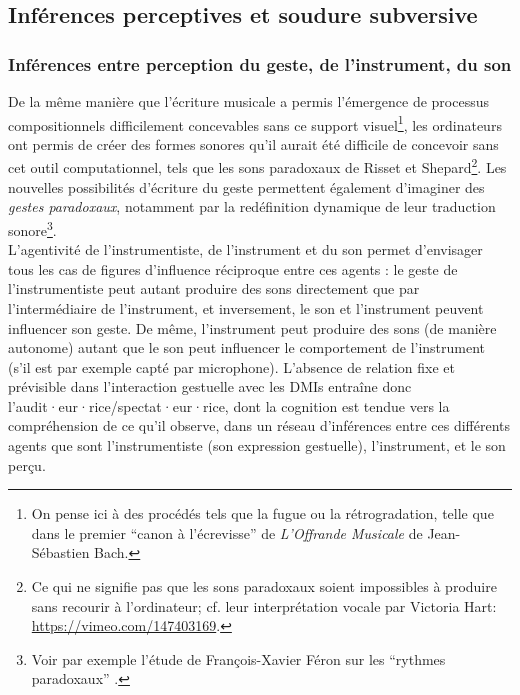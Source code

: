 \subsection{Inférences perceptives et soudure subversive}
\label{sec:gesture:inferences-soudure}

\subsubsection{Inférences entre perception du geste, de l'instrument, du son}
\label{sec:gesture:inferences-soudure:inferences}

\noindent De la même manière que l'écriture musicale a permis l'émergence de processus compositionnels difficilement concevables sans ce support visuel\footnote{On pense ici à des procédés tels que la fugue ou la rétrogradation, telle que dans le premier ``canon à l'écrevisse'' de \textit{L'Offrande Musicale} de Jean-Sébastien Bach.}, les ordinateurs ont permis de créer des formes sonores qu'il aurait été difficile de concevoir sans cet outil computationnel, tels que les sons paradoxaux de Risset et Shepard\footnote{Ce qui ne signifie pas que les sons paradoxaux soient impossibles à produire sans recourir à l'ordinateur; cf. leur interprétation vocale par Victoria Hart: \url{https://vimeo.com/147403169}.}. Les nouvelles possibilités d'écriture du geste permettent également d'imaginer des \textit{gestes paradoxaux}, notamment par la redéfinition dynamique de leur traduction sonore\footnote{Voir par exemple l'étude de François-Xavier Féron sur les ``rythmes paradoxaux'' \cite{feron_lart_2010}.}.\\
\indent L'agentivité de l'instrumentiste, de l'instrument et du son permet d'envisager tous les cas de figures d'influence réciproque entre ces agents : le geste de l'instrumentiste peut autant produire des sons directement que par l'intermédiaire de l'instrument, et inversement, le son et l'instrument peuvent influencer son geste. De même, l'instrument peut produire des sons (de manière autonome) autant que le son peut influencer le comportement de l'instrument (s'il est par exemple capté par microphone). L'absence de relation fixe et prévisible dans l'interaction gestuelle avec les \glspl{DMI} entraîne donc l'audit·eur·rice/spectat·eur·rice, dont la cognition est tendue vers la compréhension de ce qu'il observe, dans un réseau d'inférences entre ces différents agents que sont l'instrumentiste (son expression gestuelle), l'instrument, et le son perçu.\\
